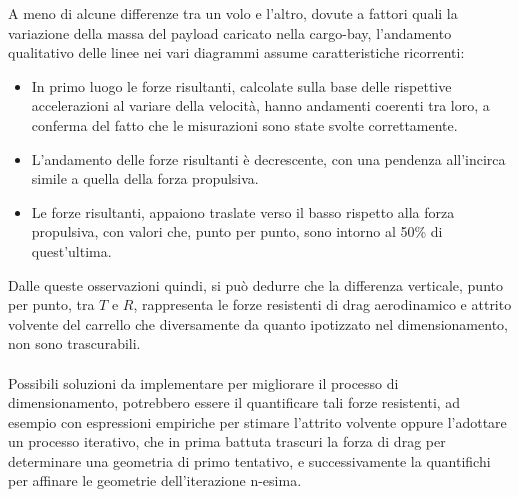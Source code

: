 \documentclass[12pt]{article}
\begin{document}
\noindent
A meno di alcune differenze tra un volo e l'altro, dovute a fattori quali la variazione della massa del payload caricato nella cargo-bay, l'andamento qualitativo delle linee nei vari diagrammi assume caratteristiche ricorrenti:
\begin{itemize}
\item In primo luogo le forze risultanti, calcolate sulla base delle rispettive accelerazioni al variare della velocità, hanno andamenti coerenti tra loro, a conferma del fatto che le misurazioni sono state svolte correttamente.
\item L'andamento delle forze risultanti è decrescente, con una pendenza all'incirca simile a quella della forza propulsiva.
\item Le forze risultanti, appaiono traslate verso il basso rispetto alla forza propulsiva, con valori che, punto per punto, sono intorno al 50\% di quest'ultima.
\end{itemize}
Dalle queste osservazioni quindi, si può dedurre che la differenza verticale, punto per punto, tra $T$ e $R$, rappresenta le forze resistenti di drag aerodinamico e attrito volvente del carrello che diversamente da quanto ipotizzato nel dimensionamento, non sono trascurabili.
\\\\
Possibili soluzioni da implementare per migliorare il processo di dimensionamento, potrebbero essere il quantificare tali forze resistenti, ad esempio con espressioni empiriche per stimare l'attrito volvente oppure l'adottare un processo iterativo, che in prima battuta trascuri la forza di drag per determinare una geometria di primo tentativo, e successivamente la quantifichi per affinare le geometrie dell'iterazione n-esima.

\newpage


\end{document}
